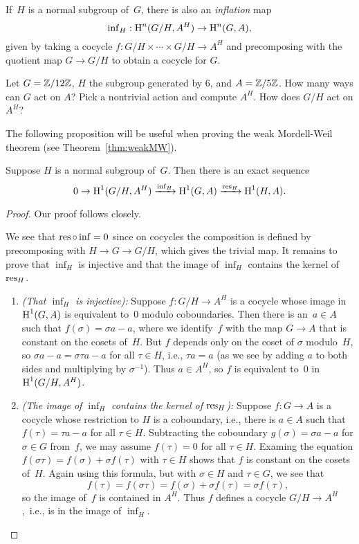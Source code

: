 If~$H$ is a normal subgroup of~$G$, there is also an \emph{inflation} map
$$
	\operatorname{inf}_H : \operatorname{H}^n(G/H, A^H) \to \operatorname{H}^n(G,A),
$$
given by taking a cocycle $f : G/H \times \cdots \times G/H \to A^H$
and precomposing with the quotient map $G\to G/H$ to
obtain a cocycle for $G$.

\begin{exercise}
	Let $G = \mathbb{Z}/12\mathbb{Z}$, $H$ the subgroup generated by $6$, and $A = \mathbb{Z}/5\mathbb{Z}$.
	How many ways can $G$ act on $A$? Pick a nontrivial action and compute $A^H$.
	How does $G/H$ act on $A^H$?
\end{exercise}

The following proposition will be useful when proving
the weak Mordell-Weil theorem (see Theorem~\ref{thm:weakMW}).
\begin{proposition}\label{prop:infres}
	Suppose $H$ is a normal subgroup of~$G$.
	Then there is an exact sequence
	$$
		0 \to \operatorname{H}^1(G/H, A^H)\xrightarrow{\operatorname{inf}_H}  \operatorname{H}^1(G,A)\xrightarrow{\operatorname{res}_H} \operatorname{H}^1(H,A).
	$$
\end{proposition}
\begin{proof}
Our proof follows \cite[pg.~117]{serre:localfields} closely.

We see that $\operatorname{res}\circ \operatorname{inf} = 0$ since on cocycles the composition is
defined by precomposing with $H\to G\to G/H$, which gives the trivial map.
It remains to prove that $\inf_H$ is injective and that the image of $\inf_H$
contains the kernel of $\operatorname{res}_H$.
\begin{enumerate}
\item {\em (That $\inf_H$ is injective):}
	Suppose $f:G/H\to A^H$ is a cocycle whose image in $\operatorname{H}^1(G,A)$
	is equivalent to~$0$ modulo coboundaries. Then there is an~$a\in A$
	such that $f(\sigma) = \sigma a - a$, where we identify~$f$ with
	the map $G\to A$ that is constant on the cosets of~$H$. But $f$
	depends only on the coset of $\sigma$ modulo~$H$, so
	$\sigma a - a = \sigma \tau a - a$ for all $\tau \in H$, i.e.,
	$\tau a = a$ (as we see by adding $a$ to both sides and multiplying
	by $\sigma^{-1}$). Thus $a\in A^H$, so $f$ is equivalent to~$0$ in
	$\operatorname{H}^1(G/H,A^H)$.

\item {\em (The image of $\inf_H$ contains the kernel of $\operatorname{res}_H$):}
	Suppose $f:G\to A$ is a cocycle whose
	restriction to $H$ is a coboundary, i.e., there is $a\in A$ such
	that $f(\tau) = \tau a - a$ for all $\tau \in H$.
	Subtracting the coboundary $g(\sigma) = \sigma a - a$ for $\sigma\in G$
	from~$f$, we may assume $f(\tau) = 0$ for all $\tau \in H$.
	Examing the equation $f(\sigma\tau) = f(\sigma) + \sigma f(\tau)$
	with $\tau\in H$ shows that $f$ is constant on the cosets of~$H$.
	Again using this formula, but with $\sigma\in H$ and $\tau\in G$, we see
	that
	$$
	  f(\tau) = f(\sigma \tau) = f(\sigma) + \sigma f(\tau) = \sigma f(\tau),
	$$
	so the image of~$f$ is contained in $A^H$.  Thus $f$ defines a cocycle
	$G/H \to A^H$,~i.e., is in the image of $\inf_H$.
\end{enumerate}
\end{proof}

